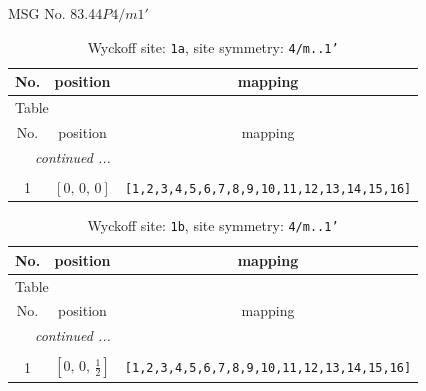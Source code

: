 \documentclass[fleqn,8pt]{jsarticle}
\begin{document}
\setcounter{MaxMatrixCols}{32}

\renewcommand{\tablename}{Table~}
\renewcommand{\figurename}{Figure~}
\begin{center}
\LARGE
MSG No. 83.44\quad$P4/m1'$
\end{center}
\renewcommand{\arraystretch}{1.2}
\begin{longtable}{ccc}
\caption{Wyckoff site: {\tt 1a}, site symmetry: {\tt 4/m..1'}}
 \\
 \hline \hline
No. & position & mapping \\ \hline \endfirsthead

\multicolumn{2}{l}{\tablename\ \thetable{}} \\
 \hline \hline
No. & position & mapping \\ \hline \endhead

 \hline \hline
\multicolumn{2}{r}{\footnotesize\it continued ...} \\ \endfoot

 \hline \hline
\multicolumn{2}{r}{} \\ \endlastfoot

1 & $\left[ 0,\, 0,\, 0 \right]$ & {\tt [1,2,3,4,5,6,7,8,9,10,11,12,13,14,15,16]} \\
\end{longtable}
\renewcommand{\arraystretch}{1.2}
\begin{longtable}{ccc}
\caption{Wyckoff site: {\tt 1b}, site symmetry: {\tt 4/m..1'}}
 \\
 \hline \hline
No. & position & mapping \\ \hline \endfirsthead

\multicolumn{2}{l}{\tablename\ \thetable{}} \\
 \hline \hline
No. & position & mapping \\ \hline \endhead

 \hline \hline
\multicolumn{2}{r}{\footnotesize\it continued ...} \\ \endfoot

 \hline \hline
\multicolumn{2}{r}{} \\ \endlastfoot

1 & $\left[ 0,\, 0,\, \frac{1}{2} \right]$ & {\tt [1,2,3,4,5,6,7,8,9,10,11,12,13,14,15,16]} \\
\end{longtable}
\renewcommand{\arraystretch}{1.2}
\end{document}
